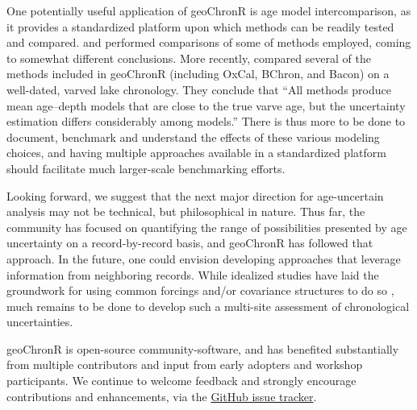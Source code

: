 \documentclass[gchron, manuscript]{copernicus}
\begin{document}
One potentially useful application of geoChronR is age model intercomparison, as it provides a standardized platform upon which methods can be readily tested and compared.
\citet{Scholz_QG2012} and \citet{Parnell_QSR2011} performed comparisons of some of methods employed, coming to somewhat different conclusions. More recently, \citet{trachsel2017} compared several of the methods included in geoChronR (including OxCal, BChron, and Bacon) on a well-dated, varved lake chronology.
They conclude that ``All methods produce mean age--depth models that are close to the true varve age, but the uncertainty estimation differs considerably among models.''
There is thus more to be done to document, benchmark and understand the effects of these various modeling choices, and having multiple approaches available in a standardized platform should facilitate much larger-scale benchmarking efforts.

Looking forward, we suggest that the next major direction for age-uncertain analysis may not be technical, but philosophical in nature. Thus far, the community has focused on quantifying the range of possibilities presented by age uncertainty on a record-by-record basis, and geoChronR has followed that approach. In the future, one could envision developing approaches that leverage information from neighboring records. While idealized studies have laid the groundwork for using common forcings and/or covariance structures to do so \citep{wernerTingley2015}, much remains to be done to develop such a multi-site assessment of chronological uncertainties.

geoChronR is open-source community-software, and has benefited substantially from multiple contributors and input from early adopters and workshop participants.
We continue to welcome feedback and strongly encourage contributions and enhancements, via the \href{https://github.com/nickmckay/geoChronR/issues}{GitHub issue tracker}.



\end{document}
